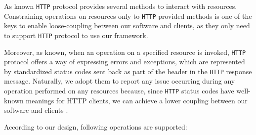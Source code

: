 \documentclass[12pt,a4paper]{report}
\begin{document}
As known \texttt{HTTP} protocol provides several methods to interact with resources. Constraining operations on resources only to \texttt{HTTP} provided methods is one of the keys to enable loose-coupling between our software and clients, as they only need to support \texttt{HTTP} protocol to use our framework\cite{Guinard}.   

Moreover, as known, when an operation on a specified resource is invoked, \texttt{HTTP} protocol offers a way of expressing errors and exceptions, which are represented by standardized status codes sent back as part of the header in the \texttt{HTTP} response message. Naturally, we adopt them to report any issue occurring during any operation performed on any resources because, since \texttt{HTTP} status codes have well-known meanings for HTTP clients, we can achieve a lower coupling between our software and clients \cite{Guinard}\cite{HTTP}. 

According to our design, following operations are supported:
\end{document}
